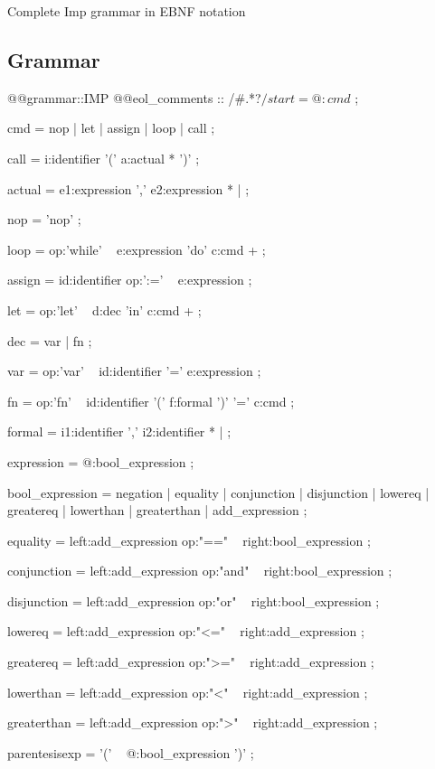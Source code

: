 \documentclass{beamer}
\begin{document}
\begin{frame}{Complete Imp grammar in EBNF notation}

\subsection{Grammar}

\begin{python}
@@grammar::IMP
@@eol_comments :: /#.*?$/

start =  @:cmd $ ;

cmd = nop | let | assign | loop | call ;

call = i:identifier '(' { a:actual }* ')' ;

actual = e1:expression { ',' e2:expression }* | {} ;

nop = 'nop' ;

loop = op:'while' ~ e:expression 'do' { c:cmd }+ ;

assign = id:identifier op:':=' ~ e:expression ;

let = op:'let' ~ d:dec 'in' { c:cmd }+ ; 

dec = var | fn ;
    
var = op:'var' ~ id:identifier '=' e:expression ;

fn = op:'fn' ~ id:identifier '(' f:formal ')' '=' c:cmd ;

formal = i1:identifier { ',' i2:identifier }* | {} ;

expression = @:bool_expression ;

bool_expression = negation | equality | conjunction | disjunction 
                | lowereq | greatereq | lowerthan | greaterthan 
                | add_expression ;

equality = left:add_expression op:"==" ~ right:bool_expression ;

conjunction = left:add_expression op:"and" ~ right:bool_expression ;

disjunction = left:add_expression op:"or" ~ right:bool_expression ;

lowereq = left:add_expression op:"<=" ~ right:add_expression ;

greatereq = left:add_expression op:">=" ~ right:add_expression ;

lowerthan = left:add_expression op:"<" ~ right:add_expression ;

greaterthan = left:add_expression op:">" ~ right:add_expression ;

parentesisexp = '(' ~ @:bool_expression ')' ;


\end{python}
\end{frame}
\end{document}
